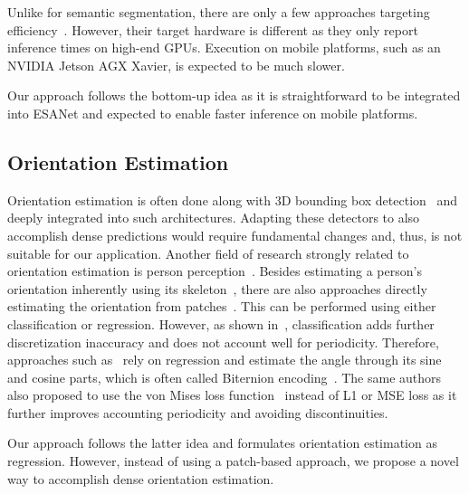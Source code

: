 \documentclass[conference]{IEEEtran}
\begin{document}
Unlike for semantic segmentation, there are only a few approaches targeting efficiency~\cite{EfficientPTS-ijcv2021, LPSNet-cvpr2021, EPSNet-accv2020, RealTime-Panoptic-cvpr2020, FastPanoptic-ral2020}. 
However, their target hardware is different as they only report inference times on high-end GPUs. 
Execution on mobile platforms, such as an NVIDIA Jetson AGX Xavier, is expected to be much slower.

Our approach follows the bottom-up idea as it is straightforward to be integrated into ESANet and expected to enable faster inference on mobile platforms.

\subsection{Orientation Estimation}
\label{sec:related_work:orientation_estimation}
Orientation estimation is often done along with 3D bounding box detection~\cite{3DBBox-Estimation-cvpr2017, monocular3DObjectDetection-cvpr2019, ObjectsAreDifferent3D-cvpr2021} and deeply integrated into such architectures. 
Adapting these detectors to also accomplish dense predictions would require fundamental changes and, thus, is not suitable for our application.
Another field of research strongly related to orientation estimation is person perception~\cite{OpenPose-cvpr2017,Biternion-gcpr2015,DeepOrientation-iros2019,RealtimePersonOrientationEstimation-ecmr2019,MTPersonPerception-iros2020}.
Besides estimating a person's orientation inherently using its skeleton~\cite{OpenPose-cvpr2017}, there are also approaches directly estimating the orientation from patches~\cite{Biternion-gcpr2015, RealtimePersonOrientationEstimation-ecmr2019, DeepOrientation-iros2019,MTPersonPerception-iros2020}.
This can be performed using either classification or regression. 
However, as shown in~\cite{Biternion-gcpr2015}, classification adds further discretization inaccuracy and does not account well for periodicity. 
Therefore, approaches such as~\cite{DeepOrientation-iros2019, Biternion-gcpr2015} rely on regression and estimate the angle through its sine and cosine parts, which is often called Biternion encoding~\cite{Biternion-gcpr2015}.
The same authors also proposed to use the von Mises loss function~\cite{Biternion-gcpr2015} instead of L1 or MSE loss as it further improves accounting periodicity and avoiding discontinuities.

Our approach follows the latter idea and formulates orientation estimation as regression.
However, instead of using a patch-based approach, we propose a novel way to accomplish dense orientation estimation.
\end{document}
